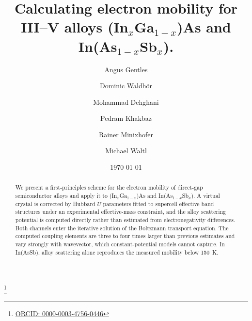 \documentclass[aps,prmaterials,reprint,amsmath,amssymb,superscriptaddress]{revtex4-2}
\begin{document}
\title[III--V alloy electron mobility]{Calculating electron mobility for III--V alloys (In$_{x}$Ga$_{1-x}$)As and In(As$_{1-x}$Sb$_x$).}
\author{Angus Gentles}

\author{Dominic Waldh{\"o}r}

\author{Mohammad Dehghani}
\thanks{\href{https://orcid.org/0000-0003-4756-0446}{ORCID: 0000-0003-4756-0446}}

\author{Pedram Khakbaz}
\author{Rainer Minixhofer}

\author{Michael Waltl}

\date{\today}

\begin{abstract}
We present a first-principles scheme for the electron mobility of direct-gap semiconductor
alloys and apply it to (In$_x$Ga$_{1-x}$)As and In(As$_{1-x}$Sb$_x$). A virtual crystal is
corrected by Hubbard $U$ parameters fitted to supercell effective band structures under an
experimental effective-mass constraint, and the alloy scattering potential is computed
directly rather than estimated from electronegativity differences. Both channels enter the
iterative solution of the Boltzmann transport equation. The computed coupling elements are
three to four times larger than previous estimates and vary strongly with wavevector, which
constant-potential models cannot capture. In In(AsSb), alloy scattering alone reproduces
the measured mobility below \SI{150}{\kelvin}.
\end{abstract}

\maketitle
\end{document}
